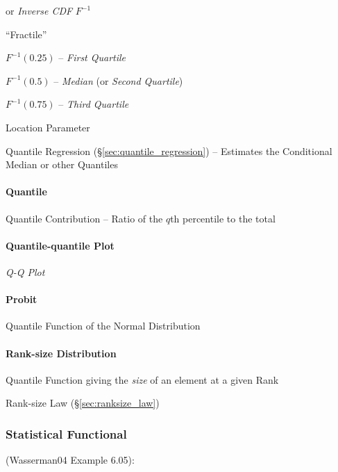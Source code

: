 or \emph{Inverse CDF} $F^{-1}$

``Fractile''

$F^{-1}(0.25)$ -- \emph{First Quartile}

$F^{-1}(0.5)$ -- \emph{Median} (or \emph{Second Quartile})

$F^{-1}(0.75)$ -- \emph{Third Quartile}

Location Parameter

Quantile Regression (\S\ref{sec:quantile_regression}) -- Estimates the
Conditional Median or other Quantiles



\paragraph{Quantile}\label{sec:quantile}\hfill

Quantile Contribution -- Ratio of the $q$th percentile to the total



\paragraph{Quantile-quantile Plot}\label{sec:qq_plot}\hfill

\emph{Q-Q Plot}



\paragraph{Probit}\label{sec:probit}\hfill

Quantile Function of the Normal Distribution



\paragraph{Rank-size Distribution}\label{sec:rank_size}\hfill

Quantile Function giving the \emph{size} of an element at a given Rank

\fist Rank-size Law (\S\ref{sec:ranksize_law})



\subsubsection{Statistical Functional}\label{sec:statistical_functional}

(Wasserman04 Example 6.05):

